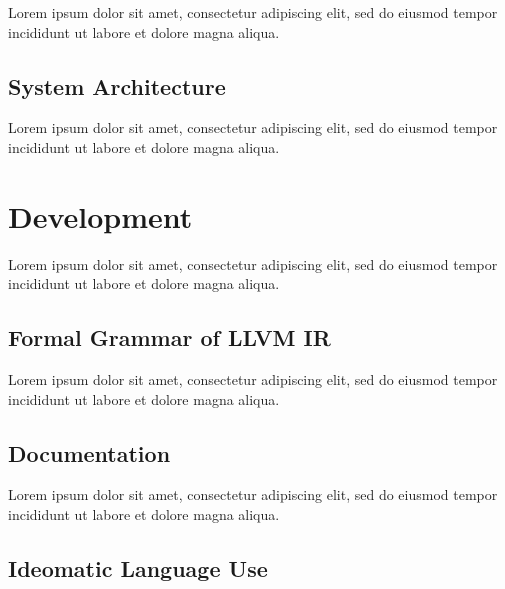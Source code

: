 \documentclass[12pt, a4paper]{article}
\begin{document}
Lorem ipsum dolor sit amet, consectetur adipiscing elit, sed do eiusmod tempor incididunt ut labore et dolore magna aliqua.


\subsection{System Architecture}

Lorem ipsum dolor sit amet, consectetur adipiscing elit, sed do eiusmod tempor incididunt ut labore et dolore magna aliqua.



\section{Development}

Lorem ipsum dolor sit amet, consectetur adipiscing elit, sed do eiusmod tempor incididunt ut labore et dolore magna aliqua.


\subsection{Formal Grammar of LLVM IR}

Lorem ipsum dolor sit amet, consectetur adipiscing elit, sed do eiusmod tempor incididunt ut labore et dolore magna aliqua.


\subsection{Documentation}

Lorem ipsum dolor sit amet, consectetur adipiscing elit, sed do eiusmod tempor incididunt ut labore et dolore magna aliqua.


\subsection{Ideomatic Language Use}
\end{document}

